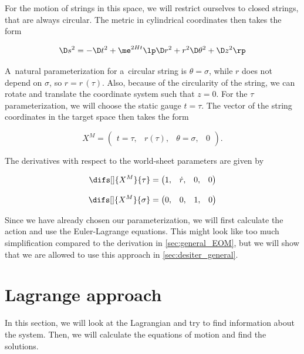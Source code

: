 \noindent
For the motion of strings in this space, we will restrict ourselves to closed strings, that are always circular. The metric in cylindrical coordinates then takes the form

\begin{equation}
    \D s^2 = - \D t^2 + \me^{2Ht} \lp \D r^2 + r^2\D \theta^2 + \D z^2 \rp
\end{equation}

\noindent
A~natural parameterization for a~circular string is $\theta = \sigma$, while $r$ does not depend on $\sigma$, so $r = r\,(\tau)$. Also, because of the circularity of the string, we can rotate and translate the coordinate system such that $z = 0$. For the $\tau$ parameterization, we will choose the static gauge $t = \tau$. The vector of the string coordinates in the target space then takes the form

\begin{equation}
\label{eq:DSS_X}
    X^M = 
    \begin{pmatrix} 
    t = \tau, & r(\tau), & \theta = \sigma, & 0
    \end{pmatrix}.
\end{equation}

\noindent
The derivatives with respect to the world-sheet parameters are given by

\begin{align}
    \difs[] {X^M} {\tau} & = 
    \begin{pmatrix}
    1, & \dot{r}, & 0, & 0
    \end{pmatrix} \label{eq:DSS_x.}
    \\[8pt]
    \difs[] {X^M} {\sigma} & = 
    \begin{pmatrix} 
    0, & 0, & 1, & 0
    \end{pmatrix} \label{eq:DSS_x,}
\end{align}

\noindent
Since we have already chosen our parameterization, we will first calculate the action and use the Euler-Lagrange equations. This might look like too much simplification compared to the derivation in \cref{sec:general_EOM}, but we will show that we are allowed to use this approach in \cref{sec:desiter_general}.


\section{Lagrange approach}

In this section, we will look at the Lagrangian and try to find information about the system. Then, we will calculate the equations of motion and find the solutions.


